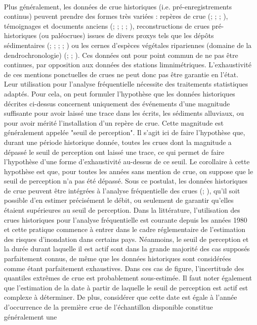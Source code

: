 	\paragraph{} Plus généralement, les données de crue historiques (i.e. pré-enregistrements continus) peuvent prendre des formes très variées : repères de crue (\cite{parkes_defining_2016}; \cite{piotte_collection_2016}; \cite{engeland_new_2020}; \cite{medd_reperes_2023}), témoignages et documents anciens (\cite{pichard_les_1995}; \cite{naulet_flood_2005}; \cite{neppel_flood_2010}; \cite{kjeldsen_documentary_2014}; \cite{macdonald_reassessing_2014}), reconstructions de crues pré-historiques (ou paléocrues) issues de divers proxys tels que les dépôts sédimentaires (\cite{baker_paleoflood_1987}; \cite{dezileau_multidating_2014}; \cite{engeland_new_2020}; \cite{corella_1400-years_2021}; \cite{wilhelm_reconstructing_2022}) ou les cernes d'espèces végétales ripariennes (domaine de la dendrochronologie) (\cite{martens_dendrochronological_1992}; \cite{loomans_flood_1993}; \cite{ballesteros-canovas_review_2015}). Ces données ont pour point commun de ne pas être continues, par opposition aux données des stations limnimétriques. L'exhaustivité de ces mentions ponctuelles de crues ne peut donc pas être garantie en l'état. Leur utilisation pour l'analyse fréquentielle nécessite des traitements statistiques adaptés. Pour cela, on peut formuler l'hypothèse que les données historiques décrites ci-dessus concernent uniquement des événements d'une magnitude suffisante pour avoir laissé une trace dans les écrits, les sédiments alluviaux, ou pour avoir mérité l'installation d'un repère de crue. Cette magnitude est généralement appelée "seuil de perception". Il s'agit ici de faire l'hypothèse que, durant une période historique donnée, toutes les crues dont la magnitude a dépassé le seuil de perception ont laissé une trace, ce qui permet de faire l'hypothèse d'une forme d'exhaustivité au-dessus de ce seuil. Le corollaire à cette hypothèse est que, pour toutes les années sans mention de crue, on suppose que le seuil de perception n'a pas été dépassé. Sous ce postulat, les données historiques de crue peuvent être intégrées à l'analyse fréquentielle des crues (\cite{gerard_probability_1979}; \cite{stedinger_flood_1986}), qu'il soit possible d'en estimer précisément le débit, ou seulement de garantir qu'elles étaient supérieures au seuil de perception. Dans la littérature, l'utilisation des crues historiques pour l'analyse fréquentielle est courante depuis les années 1980 et cette pratique commence à entrer dans le cadre réglementaire de l'estimation des risques d'inondation dans certains pays. Néanmoins, le seuil de perception et la durée durant laquelle il est actif sont dans la grande majorité des cas supposés parfaitement connus, de même que les données historiques sont considérées comme étant parfaitement exhaustives. Dans ces cas de figure, l'incertitude  des quantiles extrêmes de crue est probablement sous-estimée. Il faut noter également que l'estimation de la date à partir de laquelle le seuil de perception est actif est complexe à déterminer. De plus, considérer que cette date est égale à l'année d'occurrence de la première crue de l'échantillon disponible constitue généralement une 